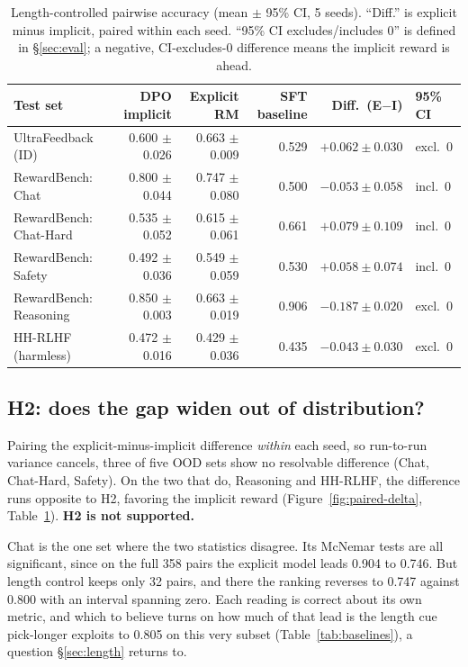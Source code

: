 \documentclass[11pt]{article}
\begin{document}
\begin{table}[H]
\centering
\caption{Length-controlled pairwise accuracy (mean $\pm$ 95\% CI, 5 seeds). ``Diff.'' is
explicit minus implicit, paired within each seed. ``95\% CI
excludes/includes 0'' is defined in \S\ref{sec:eval}; a negative, CI-excludes-0 difference means
the implicit reward is ahead.}
\label{tab:results}
\small
\begin{tabular}{lrrrrl}
\toprule
Test set & DPO implicit & Explicit RM & SFT baseline & Diff.\ (E$-$I) & 95\% CI \\
\midrule
UltraFeedback (ID)      & 0.600 $\pm$ 0.026 & 0.663 $\pm$ 0.009 & 0.529 & $+0.062\pm0.030$ & excl.\ 0 \\
RewardBench: Chat        & 0.800 $\pm$ 0.044 & 0.747 $\pm$ 0.080 & 0.500 & $-0.053\pm0.058$ & incl.\ 0 \\
RewardBench: Chat-Hard   & 0.535 $\pm$ 0.052 & 0.615 $\pm$ 0.061 & 0.661 & $+0.079\pm0.109$ & incl.\ 0 \\
RewardBench: Safety      & 0.492 $\pm$ 0.036 & 0.549 $\pm$ 0.059 & 0.530 & $+0.058\pm0.074$ & incl.\ 0 \\
RewardBench: Reasoning   & 0.850 $\pm$ 0.003 & 0.663 $\pm$ 0.019 & 0.906 & $-0.187\pm0.020$ & excl.\ 0 \\
HH-RLHF (harmless)       & 0.472 $\pm$ 0.016 & 0.429 $\pm$ 0.036 & 0.435 & $-0.043\pm0.030$ & excl.\ 0 \\
\bottomrule
\end{tabular}
\end{table}

\subsection{H2: does the gap widen out of distribution?}
Pairing the explicit-minus-implicit difference \emph{within} each seed, so run-to-run variance
cancels, three of five OOD sets show no resolvable difference (Chat, Chat-Hard, Safety). On the
two that do, Reasoning and HH-RLHF, the difference runs opposite to H2, favoring the implicit
reward (Figure~\ref{fig:paired-delta}, Table~\ref{tab:results}). \textbf{H2 is not supported.}

Chat is the one set where the two statistics disagree. Its McNemar tests are all significant,
since on the full 358 pairs the explicit model leads 0.904 to 0.746. But length control keeps
only 32 pairs, and there the ranking reverses to 0.747 against 0.800 with an interval spanning
zero. Each reading is correct about its own metric, and which to believe turns on how much of
that lead is the length cue pick-longer exploits to 0.805 on this very subset
(Table~\ref{tab:baselines}), a question \S\ref{sec:length} returns to.
\end{document}
